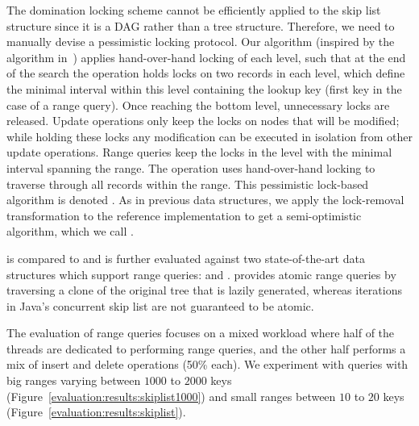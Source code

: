 The domination locking scheme cannot be efficiently applied to the skip list
structure since it is a DAG rather than a tree structure. Therefore, we need to
manually devise a pessimistic locking protocol. Our
algorithm (inspired by the algorithm in~\cite{HerlihyS2008}) applies
hand-over-hand locking of each level, such that at the end of the search the
operation holds locks on two records in each level, which define the minimal interval within this level
containing the lookup key (first key in the case of a range query). Once
reaching the bottom level, unnecessary locks are released. Update operations only keep
the locks on nodes that will be modified; while holding these locks any
modification can be executed in isolation from other update operations. Range
queries keep the locks in the level with the minimal interval spanning the
range. The operation uses hand-over-hand locking to traverse through all records
within the range. This pessimistic lock-based algorithm is denoted \domSkiplist. 
As in previous data structures, we  apply the lock-removal transformation to the
reference implementation to get a semi-optimistic algorithm, which we call
\autoSkiplist.  

\autoSkiplist is compared to \domSkiplist and is further evaluated against two
state-of-the-art data structures which support range queries: \bronson and
\skiplist.
\bronson provides atomic range queries by traversing a clone of the
original tree that is lazily generated,
whereas iterations in Java's concurrent skip list are not
guaranteed to be atomic.

The evaluation of range queries focuses on a mixed workload where half of the
threads are dedicated to performing range queries, and the other half performs a
mix of insert and delete operations (50\% each). 
We experiment with queries with big ranges varying between $1000$ to $2000$ keys
(Figure~\ref{evaluation:results:skiplist1000}) and small ranges
between $10$ to $20$
keys (Figure~\ref{evaluation:results:skiplist}).


% 


